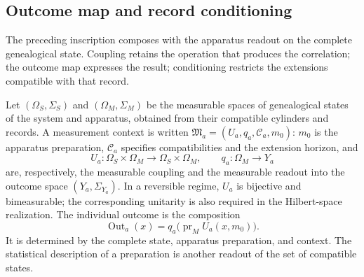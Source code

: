 \subsection{Outcome map and record conditioning}
\label{vii:sec:salida-condicionamiento}

The preceding inscription composes with the apparatus readout on the
complete genealogical state. Coupling retains the operation that produces
the correlation; the outcome map expresses the result; conditioning
restricts the extensions compatible with that record.

Let \((\Omega_S,\Sigma_S)\) and \((\Omega_M,\Sigma_M)\) be the
measurable spaces of genealogical states of the system and apparatus,
obtained from their compatible cylinders and records. A measurement
context is written \(\mathfrak M_a=(U_a,q_a,\mathcal C_a,m_0)\):
\(m_0\) is the apparatus preparation, \(\mathcal C_a\) specifies
compatibilities and the extension horizon, and
\[
 U_a:\Omega_S\times\Omega_M\longrightarrow\Omega_S\times\Omega_M,
 \qquad q_a:\Omega_M\longrightarrow Y_a
\]
are, respectively, the measurable coupling and the measurable readout into
the outcome space \((Y_a,\Sigma_{Y_a})\). In a reversible regime,
\(U_a\) is bijective and bimeasurable; the corresponding unitarity is
also required in the Hilbert-space realization. The individual outcome is the
composition
\begin{equation}
 \operatorname{Out}_a(x)
 =q_a\bigl(\operatorname{pr}_M U_a(x,m_0)\bigr).
 \label{vii:eq:out-genealogico}
\end{equation}
It is determined by the complete state, apparatus preparation, and
context. The statistical description of a preparation is another readout
of the set of compatible states.

